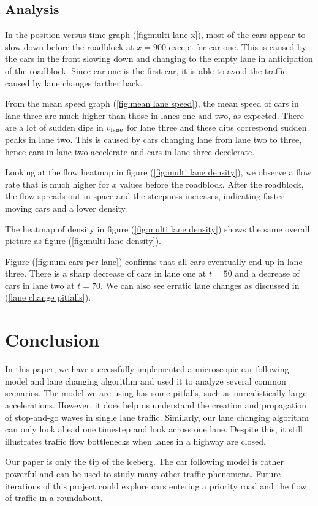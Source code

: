 \documentclass[12pt]{article}
\begin{document}
  \subsection{Analysis}

    In the position versus time graph (\ref{fig:multi lane x}), most of the cars appear to slow down before the roadblock at $x = 900$ except for car one. This is caused by the cars in the front slowing down and changing to the empty lane in anticipation of the roadblock. Since car one is the first car, it is able to avoid the traffic caused by lane changes farther back.
   
    From the mean speed graph (\ref{fig:mean lane speed}), the mean speed of cars in lane three are much higher than those in lanes one and two, as expected. There are a lot of sudden dips in $v_{\rm lane}$ for lane three and these dips correspond sudden peaks in lane two. This is caused by cars changing lane from lane two to three, hence cars in lane two accelerate and cars in lane three decelerate.

   Looking at the flow heatmap in figure (\ref{fig:multi lane density}), we observe a  flow rate that is much higher for $x$ values before the roadblock. After the roadblock, the flow spreads out in space and the steepness increases, indicating faster moving cars and a lower density.

    The heatmap of density in figure (\ref{fig:multi lane density}) shows the same overall picture as figure (\ref{fig:multi lane density}).

    Figure (\ref{fig:num cars per lane}) confirms that all cars eventually end up in lane three. There is a sharp decrease of cars in lane one at $t=50$ and a decrease of cars in lane two at $t = 70$. We can also see erratic lane changes as discussed in (\ref{lane change pitfalls}).

    \section{Conclusion}
    In this paper, we have successfully implemented a microscopic car following model and lane changing algorithm and used it to analyze several common scenarios. The model we are using has some pitfalls, such as unrealistically large accelerations. However, it does help us understand the creation and propagation of stop-and-go waves in single lane traffic. Similarly, our lane changing algorithm can only look ahead one timestep and look across one lane. Despite this, it still illustrates traffic flow bottlenecks when lanes in a highway are closed.

    Our paper is only the tip of the iceberg. The car following model is rather powerful and can be used to study many other traffic phenomena. Future iterations of this project could explore cars entering a priority road and the flow of traffic in a roundabout.
    
  \newpage    
    \printunsrtglossary[type=symbols,style=long,title={List of Symbols and Constants}]
    \newpage 
    \printbibliography
\end{document}
